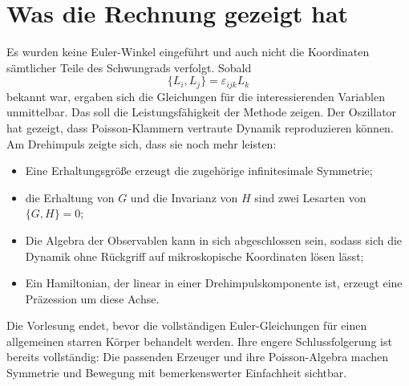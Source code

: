 \begin{classroomqa}
\end{classroomqa}

\begin{classroomqa}
\end{classroomqa}

\section{Was die Rechnung gezeigt hat}

Es wurden keine Euler-Winkel eingeführt und auch nicht die Koordinaten sämtlicher Teile des Schwungrads verfolgt. Sobald \[
  \{L_i,L_j\}=\varepsilon_{ijk}L_k
\] bekannt war, ergaben sich die Gleichungen für die interessierenden Variablen unmittelbar. Das soll die Leistungsfähigkeit der Methode zeigen. Der Oszillator hat gezeigt, dass Poisson-Klammern vertraute Dynamik reproduzieren können. Am Drehimpuls zeigte sich, dass sie noch mehr leisten:
\begin{itemize}
  \item Eine Erhaltungsgröße erzeugt die zugehörige infinitesimale Symmetrie;
  \item die Erhaltung von \(G\) und die Invarianz von \(H\) sind zwei Lesarten von \(\{G,H\}=0\);
  \item Die Algebra der Observablen kann in sich abgeschlossen sein, sodass sich die Dynamik ohne Rückgriff auf mikroskopische Koordinaten lösen lässt;
  \item Ein Hamiltonian, der linear in einer Drehimpulskomponente ist, erzeugt eine Präzession um diese Achse.
\end{itemize}
Die Vorlesung endet, bevor die vollständigen Euler-Gleichungen für einen allgemeinen starren Körper behandelt werden. Ihre engere Schlussfolgerung ist bereits vollständig: Die passenden Erzeuger und ihre Poisson-Algebra machen Symmetrie und Bewegung mit bemerkenswerter Einfachheit sichtbar.